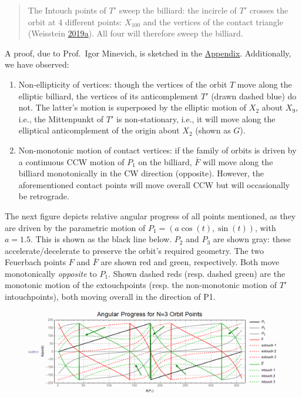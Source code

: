 \documentclass[]{article}
\providecommand{\tightlist}{%
  \setlength{\itemsep}{0pt}\setlength{\parskip}{0pt}}
\begin{document}
\begin{quote}
The Intouch points of \(T'\) sweep the billiard: the incircle of \(T'\) crosses the orbit at 4 different points: \(X_{100}\) and the vertices of the contact triangle (Weisstein \protect\hyperlink{ref-mw}{2019}\protect\hyperlink{ref-mw}{a}). All four will therefore sweep the billiard.
\end{quote}

A proof, due to Prof.~Igor Minevich, is sketched in the \href{appendices.html}{Appendix}. Additionally, we have observed:

\begin{enumerate}
\def\labelenumi{\alph{enumi}.}
\tightlist
\item
  Non-ellipticity of vertices: though the vertices of the orbit \(T\) move along the elliptic billiard, the vertices of its anticomplement \(T'\) (drawn dashed blue) do not. The latter's motion is superposed by the elliptic motion of \(X_2\) about \(X_9\), i.e., the Mittenpunkt of \(T'\) is non-stationary, i.e., it will move along the elliptical anticomplement of the origin about \(X_2\) (shown as \(G\)).
\item
  Non-monotonic motion of contact vertices: if the family of orbits is driven by a continuous CCW motion of \(P_1\) on the billiard, \(\bar{F}\) will move along the billiard monotonically in the CW direction (opposite). However, the aforementioned contact points will move overall CCW but will occasionally be retrograde.
\end{enumerate}

The next figure depicts relative angular progress of all points mentioned, as they are driven by the parametric motion of \(P_1 = (a \cos(t), \sin(t))\), with \(a=1.5\). This is shown as the black line below. \(P_2\) and \(P_3\) are shown gray: these accelerate/decelerate to preserve the orbit's required geometry. The two Feuerbach points \(F\) and \(\bar{F}\) are shown red and green, respectively. Both move monotonically \emph{opposite} to \(P_1\). Shown dashed reds (resp. dashed green) are the monotonic motion of the extouchpoints (resp. the non-monotonic motion of \(T'\) intouchpoints), both moving overall in the direction of P1.

\begin{figure}[H]

{\centering \includegraphics[width=0.75\linewidth]{pics/angular_progress} 

}

\end{figure}
\end{document}
